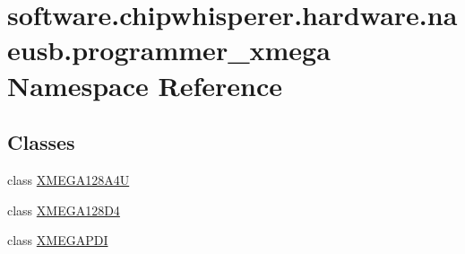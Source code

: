 \hypertarget{namespacesoftware_1_1chipwhisperer_1_1hardware_1_1naeusb_1_1programmer__xmega}{}\section{software.\+chipwhisperer.\+hardware.\+naeusb.\+programmer\+\_\+xmega Namespace Reference}
\label{namespacesoftware_1_1chipwhisperer_1_1hardware_1_1naeusb_1_1programmer__xmega}
\subsection*{Classes}
\begin{DoxyCompactItemize}
\item 
class \hyperlink{classsoftware_1_1chipwhisperer_1_1hardware_1_1naeusb_1_1programmer__xmega_1_1XMEGA128A4U}{X\+M\+E\+G\+A128\+A4\+U}
\item 
class \hyperlink{classsoftware_1_1chipwhisperer_1_1hardware_1_1naeusb_1_1programmer__xmega_1_1XMEGA128D4}{X\+M\+E\+G\+A128\+D4}
\item 
class \hyperlink{classsoftware_1_1chipwhisperer_1_1hardware_1_1naeusb_1_1programmer__xmega_1_1XMEGAPDI}{X\+M\+E\+G\+A\+P\+D\+I}
\end{DoxyCompactItemize}
